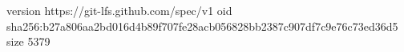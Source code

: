 version https://git-lfs.github.com/spec/v1
oid sha256:b27a806aa2bd016d4b89f707fe28acb056828bb2387c907df7c9e76c73ed36d5
size 5379
